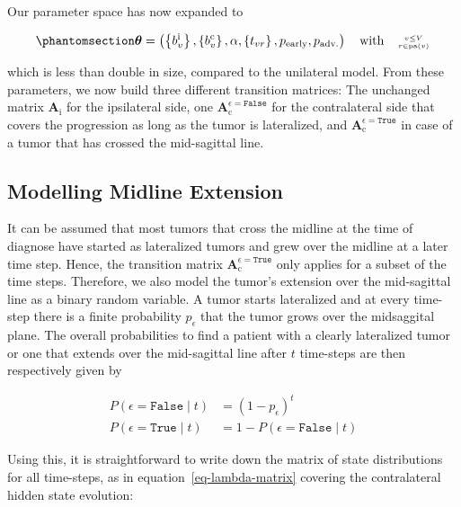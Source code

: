 \documentclass[
  sn-mathphys-num,
]{sn-jnl}
\begin{document}
Our parameter space has now expanded to

\begin{equation}\phantomsection\label{eq-bi-param-space}{
\boldsymbol{\theta} = \left( \left\{ b_v^\text{i} \right\}, \left\{ b_v^\text{c} \right\}, \alpha, \left\{ t_{vr} \right\}, p_\text{early}, p_\text{adv.} \right) \quad \text{with} \quad \genfrac{}{}{0pt}{2}{v\leq V}{r\in\operatorname{pa}(v)}
}\end{equation}

which is less than double in size, compared to the unilateral model.
From these parameters, we now build three different transition matrices:
The unchanged matrix \(\mathbf{A}_\text{i}\) for the ipsilateral side,
one \(\mathbf{A}_\text{c}^{\epsilon=\texttt{False}}\) for the
contralateral side that covers the progression as long as the tumor is
lateralized, and \(\mathbf{A}_\text{c}^{\epsilon=\texttt{True}}\) in
case of a tumor that has crossed the mid-sagittal line.

\subsection{Modelling Midline Extension}\label{sec-midline}

It can be assumed that most tumors that cross the midline at the time of
diagnose have started as lateralized tumors and grew over the midline at
a later time step. Hence, the transition matrix
\(\mathbf{A}_\text{c}^{\epsilon=\texttt{True}}\) only applies for a
subset of the time steps. Therefore, we also model the tumor's extension
over the mid-sagittal line as a binary random variable. A tumor starts
lateralized and at every time-step there is a finite probability
\(p_\epsilon\) that the tumor grows over the midsaggital plane. The
overall probabilities to find a patient with a clearly lateralized tumor
or one that extends over the mid-sagittal line after \(t\) time-steps
are then respectively given by

\[
\begin{aligned}
P(\epsilon = \texttt{False} \mid t) &= (1 - p_\epsilon)^t \\
P(\epsilon = \texttt{True} \mid t) &= 1 - P(\epsilon = \texttt{False} \mid t)
\end{aligned}
\]

Using this, it is straightforward to write down the matrix of state
distributions for all time-steps, as in equation~\ref{eq-lambda-matrix}
covering the contralateral hidden state evolution:
\end{document}
